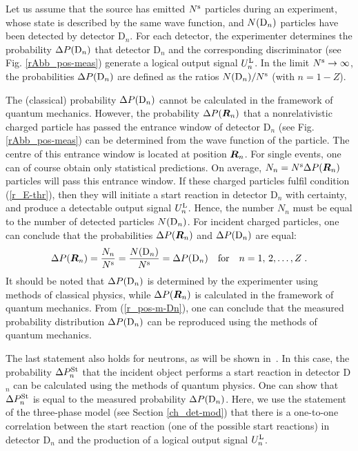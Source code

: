 \documentclass[12pt]{article}
\begin{document}
Let us assume that the source has emitted $N^{\rm s}$ particles during an experiment, whose state is described by the same wave function, and 
$N({\rm D}_n)$ particles have been detected by detector D$_n$.  
For each detector, the experimenter determines the probability $\Delta P({\rm D}_n)$ that detector D$_n$ and the corresponding discriminator (see Fig. \ref{rAbb_pos-meas}) generate a logical output signal $U_n^{\rm L}$.  
In the limit $N^{\rm s} \to \infty$, the probabilities $\Delta P({\rm D}_n)$  are defined as the ratios $N({\rm D}_n)/N^{\rm s}$ (with $n = 1 - Z$).  

The (classical) probability $\Delta P({\rm D}_n)$ cannot be calculated in the framework of quantum mechanics.  However, the probability $\Delta P(\mbox{\boldmath$R$}_n)$ that a nonrelativistic charged particle has passed the entrance window of detector D$_n$ (see Fig. \ref{rAbb_pos-meas}) can be determined from the wave function of the particle.  The centre of this entrance window is located at position $\mbox{\boldmath$R$}_n$.  
For single events, one can of course obtain only statistical predictions.  
On average, $N_n = N^{\rm s} \Delta P(\mbox{\boldmath$R$}_n)$ particles will pass this entrance window.   
If these charged particles fulfil condition (\ref{r_E-thr}), then they will initiate a start reaction in detector D$_n$ with certainty, and produce a detectable output signal $U_n^{\rm L}$.  Hence, the number $N_n$ must be equal to the number of detected particles $N({\rm D}_n)$.  
For incident charged particles, one can conclude that the probabilities $\Delta P(\mbox{\boldmath$R$}_n)$ and $\Delta P({\rm D}_n)$ are equal:  
%  
\begin{equation}\label{r_pos-m-Dn}
\Delta P(\mbox{\boldmath$R$}_n) = \frac{N_n}{N^{\rm s}} 
= \frac{N({\rm D}_n)}{N^{\rm s}} = \Delta P({\rm D}_n) 
\quad \mbox{for}  \quad n = 1, \, 2,\dots,Z \;.  
\end{equation}
%
It should be noted that $\Delta P({\rm D}_n)$ is determined by the experimenter using methods of classical physics, while $\Delta P(\mbox{\boldmath$R$}_n)$ is calculated in the framework of quantum mechanics.  From (\ref{r_pos-m-Dn}), one can conclude that the measured probability distribution $\Delta P({\rm D}_n)$ can be reproduced using the methods of quantum mechanics.  

The last statement also holds for neutrons, as will be shown in~\cite{Wick}.  In this case, the probability $\Delta P_n^{\rm St}$ that the incident object performs a start reaction in detector D$_n$ can be calculated using the methods of quantum physics.  
One can show that $\Delta P_n^{\rm St}$ is equal to the measured probability $\Delta P({\rm D}_n)$.  Here, we use the statement of the three-phase model (see Section \ref{ch_det-mod}) that there is a one-to-one correlation between the start reaction (one of the possible start reactions) in detector D$_n$ and the production of a logical output signal $U_n^{\rm L}$.  
\end{document}

